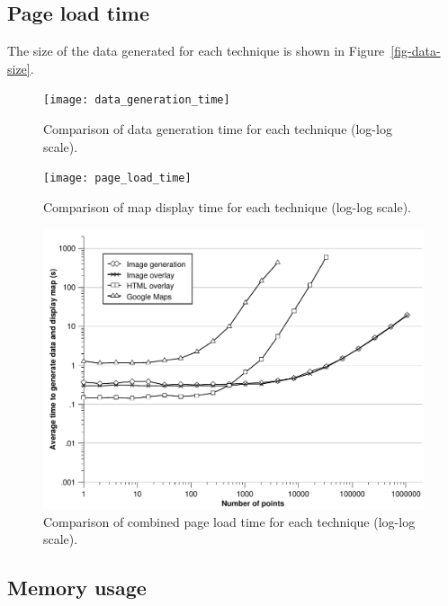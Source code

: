 \documentclass[acmtocl,acmnow]{acmtrans2m}
\begin{document}
\subsection{Page load time}

The size of the data generated for each technique is shown in
Figure~\ref{fig-data-size}.


\begin{figure}
	\begin{center}
		\texttt{[image: data\_generation\_time]}
	\end{center}
	\caption{Comparison of data generation time for each technique (log-log scale).}
	\label{fig-data-generation-time}
\end{figure}


\begin{figure}
	\begin{center}
		\texttt{[image: page\_load\_time]}
	\end{center}
	\caption{Comparison of map display time for each technique (log-log scale).}
	\label{fig-page-load-time}
\end{figure}


\begin{figure}
	\begin{center}
		\includegraphics[scale=0.66]{combined_time}
	\end{center}
	\caption{Comparison of combined page load time for each technique (log-log scale).}
	\label{fig-combined-time}
\end{figure}


\subsection{Memory usage}
\end{document}

